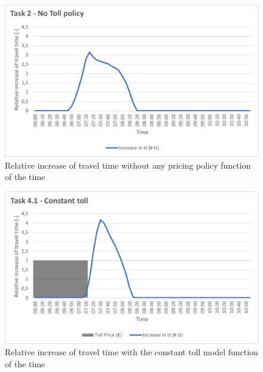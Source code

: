 \documentclass[a4paper, 12pt,oneside]{article}
\begin{document}
\begin{minipage}[c]{0.5\textwidth}
\begin{figure}[H]
    \centering
    \includegraphics[width=1\textwidth]{Images/Step4/Task4.2_No_Toll_policy.png}
    \caption{Relative increase of travel time without any pricing policy function of the time}
    \label{fig:Relative increase of travel time without any pricing policy function of the time}
\end{figure}
\end{minipage}
\begin{minipage}[c]{0.5\textwidth}
\begin{figure}[H]
    \centering
    \includegraphics[width=1\textwidth]{Images/Step4/Task4.2_constant_toll.png}
    \caption{Relative increase of travel time with the constant toll model function of the time}
    \label{fig:Relative increase of travel time with the constant toll model function of the time}
\end{figure}
\end{minipage}
\newline
\end{document}
